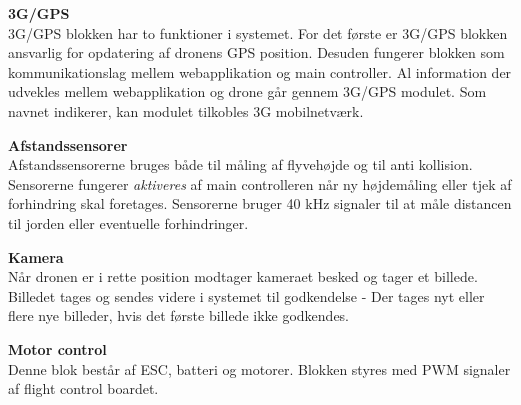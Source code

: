 \textbf{3G/GPS}\\
3G/GPS blokken har to funktioner i systemet. For det første er 3G/GPS blokken ansvarlig for opdatering af dronens GPS position. Desuden fungerer blokken som kommunikationslag mellem webapplikation og main controller. Al information der udvekles mellem webapplikation og drone går gennem 3G/GPS modulet. Som navnet indikerer, kan modulet tilkobles 3G mobilnetværk.  

\textbf{Afstandssensorer}\\
Afstandssensorerne bruges både til måling af flyvehøjde og til anti kollision. Sensorerne fungerer \textit{aktiveres} af main controlleren når ny højdemåling eller tjek af forhindring skal foretages. Sensorerne bruger 40 kHz signaler til at måle distancen til jorden eller eventuelle forhindringer.

\textbf{Kamera}\\
Når dronen er i rette position modtager kameraet besked og tager et billede. Billedet tages og sendes videre i systemet til godkendelse - Der tages nyt eller flere nye billeder, hvis det første billede ikke godkendes.

\textbf{Motor control}\\
Denne blok består af ESC, batteri og motorer. Blokken styres med PWM signaler af flight control boardet.
